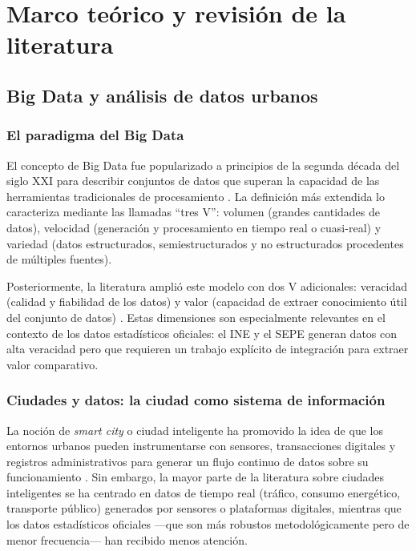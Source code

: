 \chapter{Marco teórico y revisión de la literatura}
\label{ch:literatura}

\section{Big Data y análisis de datos urbanos}

\subsection{El paradigma del Big Data}

El concepto de Big Data fue popularizado a principios de la segunda década del siglo XXI para describir conjuntos de datos que superan la capacidad de las herramientas tradicionales de procesamiento \parencite{Laney2001ThreeVs}. La definición más extendida lo caracteriza mediante las llamadas ``tres V'': volumen (grandes cantidades de datos), velocidad (generación y procesamiento en tiempo real o cuasi-real) y variedad (datos estructurados, semiestructurados y no estructurados procedentes de múltiples fuentes).

Posteriormente, la literatura amplió este modelo con dos V adicionales: veracidad (calidad y fiabilidad de los datos) y valor (capacidad de extraer conocimiento útil del conjunto de datos) \parencite{IBM2012FourVs}. Estas dimensiones son especialmente relevantes en el contexto de los datos estadísticos oficiales: el INE y el SEPE generan datos con alta veracidad pero que requieren un trabajo explícito de integración para extraer valor comparativo.

\subsection{Ciudades y datos: la ciudad como sistema de información}

La noción de \textit{smart city} o ciudad inteligente ha promovido la idea de que los entornos urbanos pueden instrumentarse con sensores, transacciones digitales y registros administrativos para generar un flujo continuo de datos sobre su funcionamiento \parencite{Batty2013NewScienceCities}. Sin embargo, la mayor parte de la literatura sobre ciudades inteligentes se ha centrado en datos de tiempo real (tráfico, consumo energético, transporte público) generados por sensores o plataformas digitales, mientras que los datos estadísticos oficiales —que son más robustos metodológicamente pero de menor frecuencia— han recibido menos atención.

